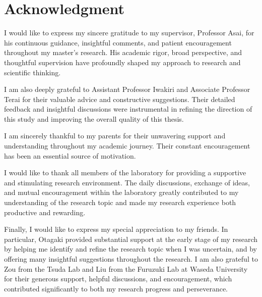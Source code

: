 \chapter*{Acknowledgment}

I would like to express my sincere gratitude to my supervisor, Professor Asai, for his continuous guidance, insightful comments, and patient encouragement throughout my master’s research. His academic rigor, broad perspective, and thoughtful supervision have profoundly shaped my approach to research and scientific thinking.

I am also deeply grateful to Assistant Professor Iwakiri and Associate Professor Terai for their valuable advice and constructive suggestions. Their detailed feedback and insightful discussions were instrumental in refining the direction of this study and improving the overall quality of this thesis.

I am sincerely thankful to my parents for their unwavering support and understanding throughout my academic journey. Their constant encouragement has been an essential source of motivation.

I would like to thank all members of the laboratory for providing a supportive and stimulating research environment. The daily discussions, exchange of ideas, and mutual encouragement within the laboratory greatly contributed to my understanding of the research topic and made my research experience both productive and rewarding.

Finally, I would like to express my special appreciation to my friends. In particular, Otagaki provided substantial support at the early stage of my research by helping me identify and refine the research topic when I was uncertain, and by offering many insightful suggestions throughout the research. I am also grateful to Zou from the Tsuda Lab and Liu from the Furuzuki Lab at Waseda University for their generous support, helpful discussions, and encouragement, which contributed significantly to both my research progress and perseverance.